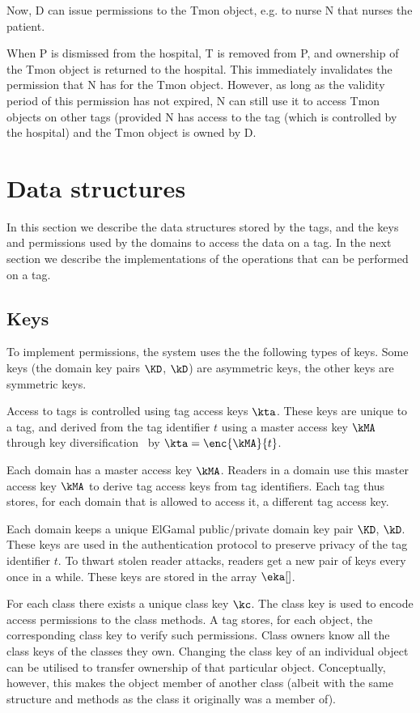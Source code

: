 Now, D can issue permissions to the Tmon object, e.g. to nurse N that nurses
the patient. 


When P is dismissed from the hospital, T is removed from P, and ownership of
the Tmon object is returned to the hospital. This immediately invalidates the
permission that N has for the Tmon object. However, as long as the validity
period of this permission has not expired, N can still use it to access Tmon
objects on other tags (provided N has access to the tag (which is controlled by
the hospital) and the Tmon object is owned by D. 

\section{Data structures}
\label{sec-datastruct}

In this section we describe the data structures stored by the tags, and the keys
and permissions used by the domains to access the data on a tag. In the next
section we describe the implementations of the operations that can be performed
on a tag.

\subsection{Keys}

To implement permissions, the system uses the 
the following types of keys. Some keys (the domain key pairs
$\KD$, $\kD$) are asymmetric keys, the other keys are symmetric keys.
\begin{description}
\fixlistspacing
\item[Tag access keys $\kta$.] 
  Access to tags is controlled using tag access keys $\kta$. These keys are
  unique to a tag, and derived from the tag identifier $t$ using a master
  access key $\kMA$ through key diversification~\cite{AndB96}
  by $\kta = \enc{\kMA}{t}$.
\item[Master access keys $\kMA$.]
  Each domain has a master access key $\kMA$.
  Readers in a domain use this master access key $\kMA$ to derive tag access 
  keys from tag identifiers. Each tag thus stores, for each domain that is
  allowed to access it, a different tag access key. 
\item[Domain key pairs $\KD$, $\kD$.] 
  Each domain keeps a unique ElGamal public/pri\-vate domain key pair $\KD$,
  $\kD$. 
  These keys are used in the
  authentication protocol to preserve privacy of the tag identifier $t$.
  To thwart stolen reader attacks, readers get a new pair of keys every
  once in a while. These keys are stored in the array $\eka[]$.
\item[Class keys $\kc$.] 
  For each class there exists a unique class key $\kc$.
  The class key is used to encode access permissions to the class methods.
  A tag stores, for each object, the corresponding class key
  to verify such permissions.
  Class owners know all the class keys of the classes they own.
  Changing the class key of an individual object can be utilised to transfer
  ownership of that particular object. Conceptually, however, this makes the
  object member of another class (albeit with the same structure and methods
  as the class it originally was a member of).
\end{description}

